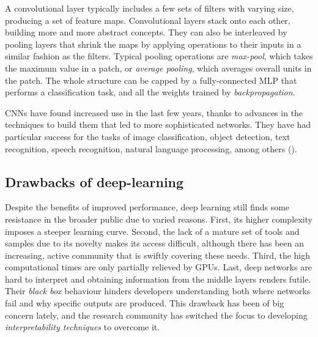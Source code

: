 A convolutional layer typically includes a few sets of filters with varying size, producing a set of feature maps. Convolutional layers stack onto each other, building more and more abstract concepts. They can also be interleaved by pooling layers that shrink the maps by applying operations to their inputs in a similar fashion as the filters. Typical pooling operations are \textit{max-pool}, which takes the maximum value in a patch, or \textit{average pooling}, which averages overall units in the patch. The whole structure can be capped by a fully-connected MLP that performs a classification task, and all the weights trained by \textit{backpropagation}.

CNNs have found increased use in the last few years, thanks to advances in the techniques to build them that led to more sophisticated networks. They have had particular success for the tasks of image classification, object detection, text recognition, speech recognition, natural language processing, among others (\cite{Gu2017}).

\subsection{Drawbacks of deep-learning}
Despite the benefits of improved performance, deep learning still finds some resistance in the broader public due to varied reasons. First, its higher complexity imposes a steeper learning curve. Second, the lack of a mature set of tools and samples due to its novelty makes its access difficult, although there has been an increasing, active community that is swiftly covering these needs. Third, the high computational times are only partially relieved by GPUs. Last, deep networks are hard to interpret and obtaining information from the middle layers renders futile. Their \textit{black box} behaviour hinders developers understanding both where networks fail and why specific outputs are produced. This drawback has been of big concern lately, and the research community has switched the focus to developing \textit{interpretability techniques} to overcome it.




